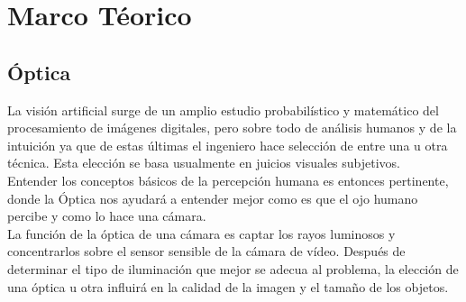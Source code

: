 \chapter{Marco Téorico}
\section{Óptica}
La visión artificial surge de un amplio estudio probabilístico y matemático del procesamiento de imágenes digitales, pero sobre todo de análisis humanos y de la intuición ya que de estas últimas el ingeniero hace selección de entre una u otra técnica. Esta elección se basa usualmente en juicios visuales subjetivos.\\
Entender los conceptos básicos de la percepción humana es entonces pertinente, donde la Óptica nos ayudará a entender mejor como es que el ojo humano percibe y como lo hace una cámara. \\
La función de la óptica de una cámara es captar los rayos luminosos y concentrarlos sobre el sensor sensible de la cámara de vídeo. Después de determinar el tipo de iluminación que mejor se adecua al problema, la elección de una óptica u otra influirá en la calidad de la imagen y el tamaño de los objetos.
